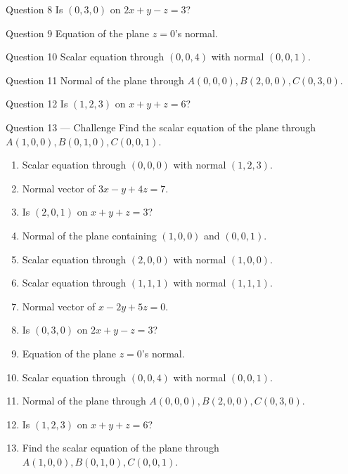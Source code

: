 \documentclass[11pt]{article}
\begin{document}
\begin{qbox}{Question 8}
Is $(0,3,0)$ on $2x+y-z=3$?\workspace{2.4cm}
\end{qbox}

\begin{qbox}{Question 9}
Equation of the plane $z=0$'s normal.\workspace{2.4cm}
\end{qbox}

\begin{qbox}{Question 10}
Scalar equation through $(0,0,4)$ with normal $(0,0,1)$.\workspace{2.4cm}
\end{qbox}

\begin{qbox}{Question 11}
Normal of the plane through $A(0,0,0),B(2,0,0),C(0,3,0)$.\workspace{2.4cm}
\end{qbox}

\begin{qbox}{Question 12}
Is $(1,2,3)$ on $x+y+z=6$?\workspace{2.4cm}
\end{qbox}

\begin{qbox}{Question 13 --- Challenge}
Find the scalar equation of the plane through $A(1,0,0),B(0,1,0),C(0,0,1)$.\workspace{3.5cm}
\end{qbox}

\clearpage
{}

\begin{recapbox}
\begin{multicols}{2}
\small
\begin{enumerate}[leftmargin=*,itemsep=3pt]
  \item Scalar equation through $(0,0,0)$ with normal $(1,2,3)$.
  \item Normal vector of $3x-y+4z=7$.
  \item Is $(2,0,1)$ on $x+y+z=3$?
  \item Normal of the plane containing $(1,0,0)$ and $(0,0,1)$.
  \item Scalar equation through $(2,0,0)$ with normal $(1,0,0)$.
  \item Scalar equation through $(1,1,1)$ with normal $(1,1,1)$.
  \item Normal vector of $x-2y+5z=0$.
  \item Is $(0,3,0)$ on $2x+y-z=3$?
  \item Equation of the plane $z=0$'s normal.
  \item Scalar equation through $(0,0,4)$ with normal $(0,0,1)$.
  \item Normal of the plane through $A(0,0,0),B(2,0,0),C(0,3,0)$.
  \item Is $(1,2,3)$ on $x+y+z=6$?
  \item Find the scalar equation of the plane through $A(1,0,0),B(0,1,0),C(0,0,1)$.
\end{enumerate}
\end{multicols}
\end{recapbox}
\end{document}
